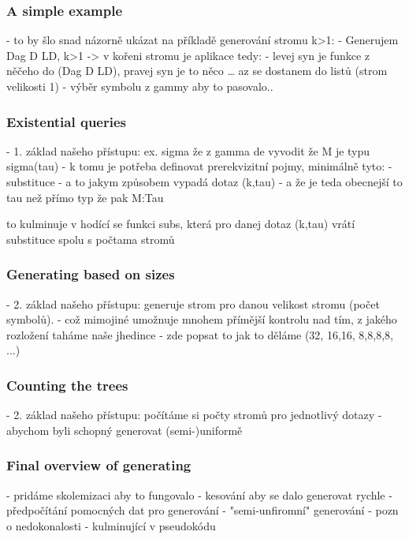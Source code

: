 \documentclass{ws-ijait}
\begin{document}
\subsubsection{A simple example}

- to by šlo snad názorně ukázat na příkladě generování stromu k>1:
- Generujem Dag D LD, k>1 -> v kořeni stromu je aplikace tedy:
- levej syn je funkce z něčeho do (Dag D LD), pravej syn je to něco
… az se dostanem do listů (strom velikosti 1) - výběr symbolu z gammy aby to pasovalo..

\subsubsection{Existential queries}

- 1. základ našeho přístupu: ex. sigma že z gamma de vyvodit že M je typu sigma(tau)
  - k tomu je potřeba definovat prerekvizitní pojmy, minimálně tyto:
    - substituce
    - a to jakym způsobem vypadá dotaz (k,tau) - a že je teda obecnejší to tau než přímo typ že pak M:Tau

to kulminuje v hodící se funkci subs, která pro danej dotaz (k,tau) vrátí substituce spolu s počtama stromů


\subsubsection{Generating based on sizes}

- 2. základ našeho přístupu: generuje strom pro danou velikost stromu (počet symbolů).
  - což mimojiné umožnuje mnohem přímější kontrolu nad tím, z jakého rozložení taháme naše jhedince 
  - zde popsat to jak to děláme (32, 16,16, 8,8,8,8, ...)

\subsubsection{Counting the trees}

- 2. základ našeho přístupu: počítáme si počty stromů pro jednotlivý dotazy 
     - abychom byli schopný generovat (semi-)uniformě

\subsubsection{Final overview of generating}

- pridáme skolemizaci aby to fungovalo
- kesování aby se dalo generovat rychle
    - předpočítání pomocných dat pro generování
    - "semi-unfiromní" generování - pozn o nedokonalosti 
- kulminující v pseudokódu
\end{document}
